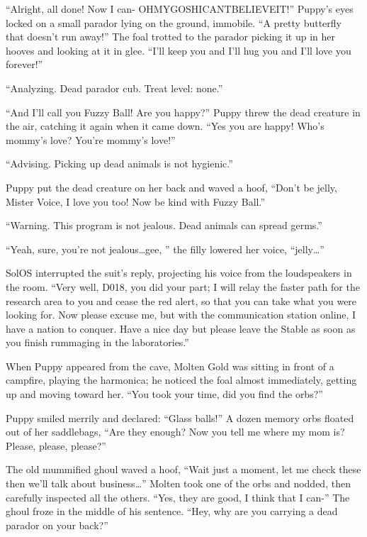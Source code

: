 ``Alright, all done! Now I can- OHMYGOSHICANTBELIEVEIT!'' Puppy's eyes locked on a small parador lying on the ground, immobile. ``A pretty butterfly that doesn't run away!'' The foal trotted to the parador picking it up in her hooves and looking at it in glee. ``I'll keep you and I'll hug you and I'll love you forever!''

``{\mt Analyzing. Dead parador cub. Treat level: none.}''

``And I'll call you Fuzzy Ball! Are you happy?'' Puppy threw the dead creature in the air, catching it again when it came down. ``Yes you are happy! Who's mommy's love? You're mommy's love!''

``{\mt Advising. Picking up dead animals is not hygienic.}''

Puppy put the dead creature on her back and waved a hoof, ``Don't be jelly, Mister Voice, I love you too! Now be kind with Fuzzy Ball.''

``{\mt Warning. This program is not jealous. Dead animals can spread germs.}''

``Yeah, sure, you're not jealous\dots gee, '' the filly lowered her voice, ``jelly\dots''

SolOS interrupted the suit's reply, projecting his voice from the loudspeakers in the room. ``Very well, D018, you did your part; I will relay the faster path for the research area to you and cease the red alert, so that you can take what you were looking for. Now please excuse me, but with the communication station online, I have a nation to conquer. Have a nice day but please leave the Stable as soon as you finish rummaging in the laboratories.''

\horizonline


When Puppy appeared from the cave, Molten Gold was sitting in front of a campfire, playing the harmonica; he noticed the foal almost immediately, getting up and moving toward her. ``You took your time, did you find the orbs?''

Puppy smiled merrily and declared: ``Glass balls!'' A dozen memory orbs floated out of her saddlebags, ``Are they enough? Now you tell me where my mom is? Please, please, please?''

The old mummified ghoul waved a hoof, ``Wait just a moment, let me check these then we'll talk about business\dots'' Molten took one of the orbs and nodded, then carefully inspected all the others. ``Yes, they are good, I think that I can-'' The ghoul froze in the middle of his sentence. ``Hey, why are you carrying a dead parador on your back?''

